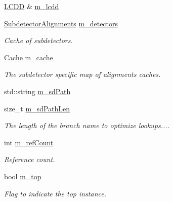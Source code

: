 \begin{DoxyCompactItemize}
\item 
\hyperlink{class_d_d4hep_1_1_geometry_1_1_l_c_d_d}{L\+C\+DD} \& \hyperlink{class_d_d4hep_1_1_alignments_1_1_global_alignment_cache_af1d0806e8ffced7c5d0f1438f58a6133}{m\+\_\+lcdd}
\item 
\hyperlink{class_d_d4hep_1_1_alignments_1_1_global_alignment_cache_abedb85cf969b8fb161695f5eca9717bc}{Subdetector\+Alignments} \hyperlink{class_d_d4hep_1_1_alignments_1_1_global_alignment_cache_abf497ee00ee5dbe22b05c75041c0e2c8}{m\+\_\+detectors}
\begin{DoxyCompactList}\small\item\em Cache of subdetectors. \end{DoxyCompactList}\item 
\hyperlink{class_d_d4hep_1_1_alignments_1_1_global_alignment_cache_a51cc6e8b7d9d85cfc296e8db7f360604}{Cache} \hyperlink{class_d_d4hep_1_1_alignments_1_1_global_alignment_cache_a00b2ed5078af798d881bf59d8a30bed3}{m\+\_\+cache}
\begin{DoxyCompactList}\small\item\em The subdetector specific map of alignments caches. \end{DoxyCompactList}\item 
std\+::string \hyperlink{class_d_d4hep_1_1_alignments_1_1_global_alignment_cache_a24050f584cfe000084802279065b8ee9}{m\+\_\+sd\+Path}
\item 
size\+\_\+t \hyperlink{class_d_d4hep_1_1_alignments_1_1_global_alignment_cache_a8adea69d0bd2c58caa97638937cafabf}{m\+\_\+sd\+Path\+Len}
\begin{DoxyCompactList}\small\item\em The length of the branch name to optimize lookups.... \end{DoxyCompactList}\item 
int \hyperlink{class_d_d4hep_1_1_alignments_1_1_global_alignment_cache_ac6889cb128e532b71a56ce2a2fdd305f}{m\+\_\+ref\+Count}
\begin{DoxyCompactList}\small\item\em Reference count. \end{DoxyCompactList}\item 
bool \hyperlink{class_d_d4hep_1_1_alignments_1_1_global_alignment_cache_ad8ec69133c554aee9f43b7952d29c65e}{m\+\_\+top}
\begin{DoxyCompactList}\small\item\em Flag to indicate the top instance. \end{DoxyCompactList}\end{DoxyCompactItemize}
